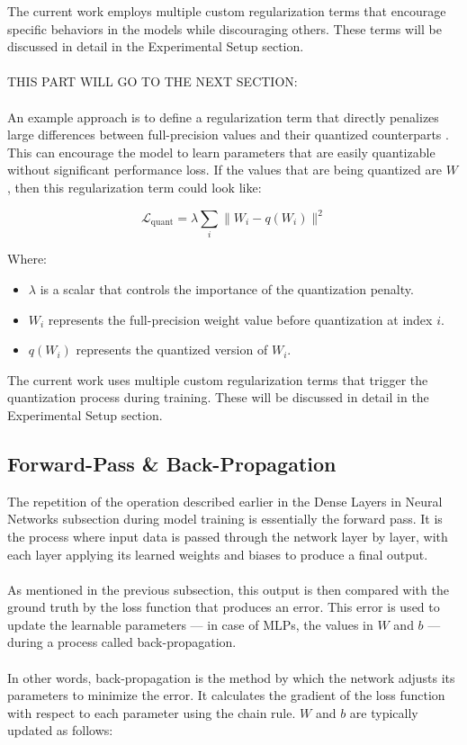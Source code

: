 \noindent The current work employs multiple custom regularization terms 
that encourage specific behaviors in the models while discouraging others. 
These terms will be discussed in detail in the Experimental Setup section.
\\
\\
THIS PART WILL GO TO THE NEXT SECTION:
\\
\\
An example approach is to define a regularization term that directly penalizes large differences between full-precision values 
and their quantized counterparts \cite{zhuang2018towards}. This can encourage the model to learn parameters that are easily quantizable without significant performance loss.
If the values that are being quantized are \( W \), then this regularization term could look like:

\[
\mathcal{L}_{\text{quant}} = \lambda \sum_{i} \| W_i - q(W_i) \|^2
\]

\noindent Where:
\begin{itemize}
    \item \( \lambda \) is a scalar that controls the importance of the quantization penalty.
    \item \( W_i \) represents the full-precision weight value before quantization at index \( i \).
    \item \( q(W_i) \) represents the quantized version of \( W_i \).
\end{itemize}

\noindent The current work uses multiple custom regularization terms that trigger the quantization process during training. 
These will be discussed in detail in the Experimental Setup section.

\subsection{Forward-Pass \& Back-Propagation}
\label{subsec:subsection2}
The repetition of the operation described earlier in the Dense Layers in Neural Networks subsection during model training 
is essentially the forward pass. It is the process where input data is passed through the network layer by layer, 
with each layer applying its learned weights and biases to produce a final output. 
\\
\\
As mentioned in the previous subsection, this output is then compared with the ground truth by the loss function that produces an error.
This error is used to update the learnable parameters — in case of MLPs, the values in \( W \) and \( b \) — during a process called back-propagation.
\\
\\
In other words, back-propagation is the method by which the network adjusts its parameters to minimize the error. 
It calculates the gradient of the loss function with respect to each parameter using the chain rule. 
\( W \) and \( b \) are typically updated as follows:

